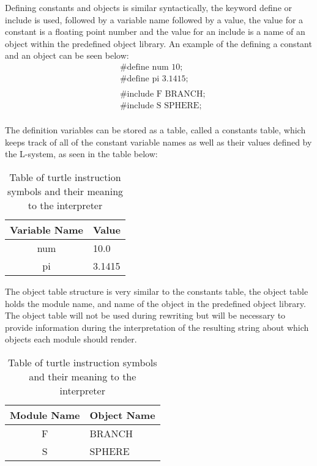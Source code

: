 \begin{flushleft}

Defining constants and objects is similar syntactically, the keyword define or include is used, followed by a variable name followed by a value, the value for a constant is a floating point number and the value for an include is a name of an object within the predefined object library. An example of the defining a constant and an object can be seen below: \\

\begin{equation} \label{constant and object example}
\begin{aligned}
	&\text{\#define num 10;}\\
	&\text{\#define pi 3.1415;}\\
	&\\
	&\text{\#include F BRANCH;}\\
	&\text{\#include S SPHERE;}\\
\end{aligned}
\end{equation}

The definition variables can be stored as a table, called a constants table, which keeps track of all of the constant variable names as well as their values defined by the L-system, as seen in the table below: \\

\vspace{5mm}

\begin{table}[h!] \center
\begin{tabular}{ | c | l | }
\hline
	Variable Name 	& Value\\  
\hline
\hline
	num 				& 10.0\\
\hline
	pi					& 3.1415\\
\hline
\end{tabular}
\caption{Table of turtle instruction symbols and their meaning to the interpreter}
\label{constants table}
\end{table}
\FloatBarrier

The object table structure is very similar to the constants table, the object table holds the module name, and name of the object in the predefined object library. The object table will not be used during rewriting but will be necessary to provide information during the interpretation of the resulting string about which objects each module should render. \\

\begin{table}[h!] \center
\begin{tabular}{ | c | l | }
\hline
	Module Name	& Object Name\\  
\hline
\hline
	F 				& BRANCH\\
\hline
	S				& SPHERE\\
\hline
\end{tabular}
\caption{Table of turtle instruction symbols and their meaning to the interpreter}
\label{constants table}
\end{table}
\FloatBarrier

\end{flushleft}

